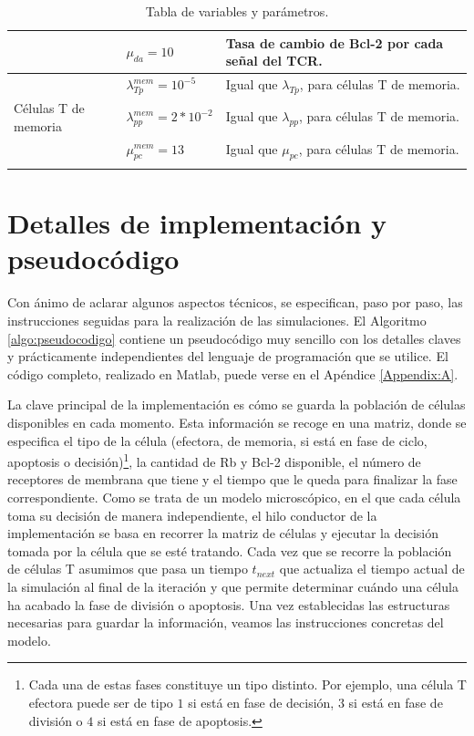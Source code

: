 \begin{table}[h]
\begin{center}
\begin{tabular}{>{\centering\arraybackslash}m{2cm} >{\arraybackslash}m{3cm} >{\arraybackslash}m{7cm} }
			& $\mu_{da} = 10$                 & Tasa de cambio de Bcl-2 por cada señal del TCR.           \\ \hline
			\multirow{4}{*}{} & $\lambda_{Tp}^{mem} = 10^{-5}$   & Igual que $\lambda_{Tp}$, para células T de memoria.      \\ \cline{2-3}
			Células T de memoria        & $\lambda_{pp}^{mem} = 2*10^{-2}$ & Igual que $\lambda_{pp}$, para células T de memoria.      \\ \cline{2-3}
			& $\mu_{pc}^{mem} = 13$           & Igual que $\mu_{pc}$, para células T de memoria.          \\ \cline{2-3}\hline
		\end{tabular}
		\caption{Tabla de variables y parámetros.}
		\label{tabla:param}
	\end{center}
\end{table}


\section{Detalles de implementación y pseudocódigo}
\label{sec:implem_pseudo}

Con ánimo de aclarar algunos aspectos técnicos, se especifican, paso por paso, las instrucciones seguidas para la realización de las simulaciones. El Algoritmo \ref{algo:pseudocodigo} contiene un pseudocódigo muy sencillo con los detalles claves y prácticamente independientes del lenguaje de programación que se utilice. El código completo, realizado en Matlab, puede verse en el Apéndice \ref{Appendix:A}.

La clave principal de la implementación es cómo se guarda la población de células disponibles en cada momento. Esta información se recoge en una matriz, donde se especifica el tipo de la célula (efectora, de memoria, si está en fase de ciclo, apoptosis o decisión)\footnote{Cada una de estas fases constituye un tipo distinto. Por ejemplo, una célula T efectora puede ser de tipo $1$ si está en fase de decisión, $3$ si está en fase de división o $4$ si está en fase de apoptosis.}, la cantidad de Rb y Bcl-2 disponible, el número de receptores de membrana que tiene y el tiempo que le queda para finalizar la fase correspondiente. Como se trata de un modelo microscópico, en el que cada célula toma su decisión de manera independiente, el hilo conductor de la implementación se basa en recorrer la matriz de células y ejecutar la decisión tomada por la célula que se esté tratando. Cada vez que se recorre la población de células T asumimos que pasa un tiempo $t_{next}$ que actualiza el tiempo actual de la simulación al final de la iteración y que permite determinar cuándo una célula ha acabado la fase de división o apoptosis. Una vez establecidas las estructuras necesarias para guardar la información, veamos las instrucciones concretas del modelo.

